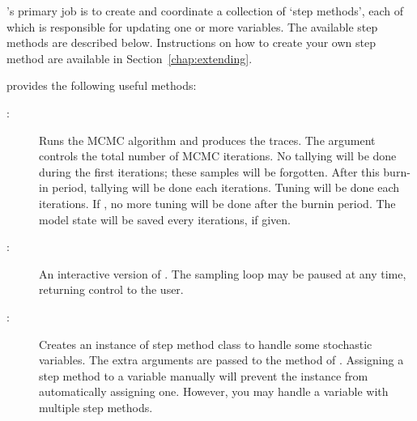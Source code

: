 \documentclass[]{jss}
\begin{document}
's primary job is to create and coordinate a collection of `step methods', each of which is responsible for updating one or more variables. The available step methods are described below. Instructions on how to create your own step method are available in Section~\ref{chap:extending}.

 provides the following useful methods:
\begin{description}
    \item[:] Runs the MCMC algorithm and produces the traces. The  argument controls the total number of MCMC iterations. No tallying will be done during the first  iterations; these samples will be forgotten. After this burn-in period, tallying will be done each  iterations. Tuning will be done each  iterations. If , no more tuning will be done after the burnin period. The model state will be saved every  iterations, if given.
    \item[:] An interactive version of . The sampling loop may be paused at any time, returning control to the user.
    \item[:] Creates an instance of step method class  to handle some stochastic variables. The extra arguments are passed to the  method of . Assigning a step method to a variable manually will prevent the  instance from automatically assigning one. However, you may handle a variable with multiple step methods.


\end{description}
\end{document}
